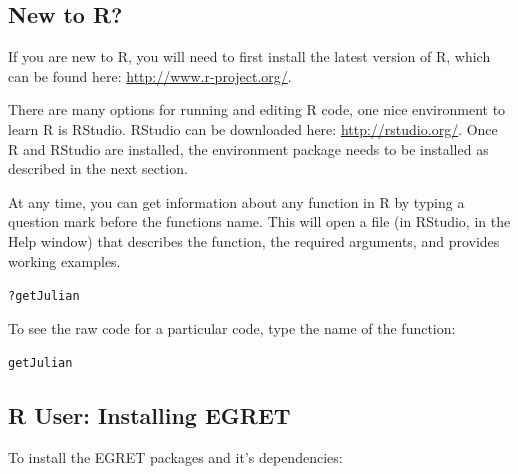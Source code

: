 \documentclass[a4paper,11pt]{article}\usepackage{graphicx, color}
\makeatletter
\newenvironment{kframe}{%
 \def\at@end@of@kframe{}%
 \ifinner\ifhmode%
  \def\at@end@of@kframe{\end{minipage}}%
  \begin{minipage}{\columnwidth}%
 \fi\fi%
 \def\FrameCommand##1{\hskip\@totalleftmargin \hskip-\fboxsep
 \colorbox{shadecolor}{##1}\hskip-\fboxsep
     \hskip-\linewidth \hskip-\@totalleftmargin \hskip\columnwidth}%
 \MakeFramed {\advance\hsize-\width
   \@totalleftmargin\z@ \linewidth\hsize
   \@setminipage}}%
 {\par\unskip\endMakeFramed%
 \at@end@of@kframe}
\newenvironment{knitrout}{}{} %
\makeatother
\begin{document}
\subsection{New to R?}
If you are new to R, you will need to first install the latest version of R, which can be found here: \url{http://www.r-project.org/}.

There are many options for running and editing R code, one nice environment to learn R is RStudio. RStudio can be downloaded here: \url{http://rstudio.org/}. Once R and RStudio are installed, the environment package needs to be installed as described in the next section.

At any time, you can get information about any function in R by typing a question mark before the functions name.  This will open a file (in RStudio, in the Help window) that describes the function, the required arguments, and provides working examples.

\begin{knitrout}
\color{fgcolor}\begin{kframe}
\begin{alltt}
?getJulian
\end{alltt}
\end{kframe}
\end{knitrout}


To see the raw code for a particular code, type the name of the function:
\begin{knitrout}
\color{fgcolor}\begin{kframe}
\begin{alltt}
getJulian
\end{alltt}
\end{kframe}
\end{knitrout}



\subsection{R User: Installing EGRET}
To install the EGRET packages and it's dependencies:
\end{document}
